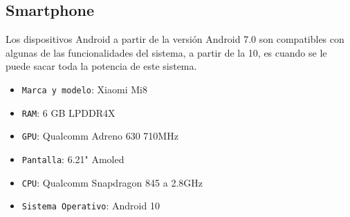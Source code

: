 \subsection{Smartphone}

Los dispositivos Android a partir de la versión Android 7.0  son compatibles con algunas de las funcionalidades del sistema, a partir de la 10, es cuando se le puede sacar toda la potencia de este sistema.
\begin{itemize}
    \item \texttt{Marca y modelo}: Xiaomi Mi8
    \item \texttt{RAM}: 6 GB LPDDR4X
    \item \texttt{GPU}: Qualcomm Adreno 630 710MHz
    \item \texttt{Pantalla}: 6.21" Amoled
    \item \texttt{CPU}: Qualcomm Snapdragon 845 a 2.8GHz
    \item \texttt{Sistema Operativo}: Android 10
\end{itemize}